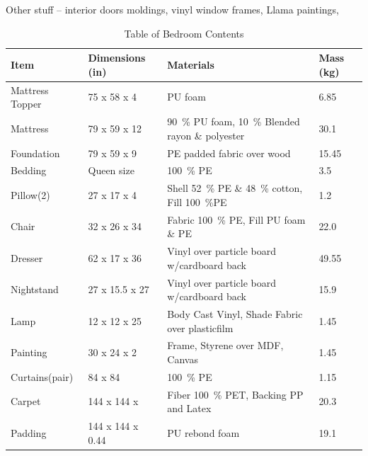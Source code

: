 \documentclass[12pt,oneside]{book}
\begin{document}
Other stuff -- interior doors moldings,  vinyl window frames, Llama paintings, 

\begin{table}[!ht]
	\centering
	\caption{Table of Bedroom Contents}
	\label{tab:BRFuel}
	\begin{tabular}{llll}
		\toprule[1.5pt]
		Item 				& Dimensions (in) 	& Materials 										& Mass (kg)  \\
		\midrule
		Mattress Topper  	& 75 x 58 x 4  		& PU foam  											& 6.85    \\
		Mattress     		& 79 x 59 x 12  	& 90~\% PU foam, 10~\% Blended rayon \& polyester   & 30.1    \\
		Foundation   		& 79 x 59 x 9  		& PE padded fabric over wood  						& 15.45   \\
		Bedding      		& Queen size 		& 100~\% PE     									& 3.5     \\	
		Pillow(2)	 		& 27 x 17 x 4 		& Shell 52~\% PE \& 48~\% cotton, Fill 100~\%PE 	& 1.2     \\	
		Chair				& 32 x 26 x 34		& Fabric 100~\% PE, Fill PU foam \& PE  			& 22.0    \\
		Dresser				& 62 x 17 x 36  	& Vinyl over particle board w/cardboard back		& 49.55   \\
		Nightstand			& 27 x 15.5 x 27	& Vinyl over particle board w/cardboard back		& 15.9    \\
		Lamp 				& 12 x 12 x 25		& Body Cast Vinyl, Shade Fabric over plasticfilm	& 1.45    \\
		Painting			& 30 x 24 x 2		& Frame, Styrene over MDF, Canvas					& 1.45    \\
		Curtains(pair) 		& 84 x 84 			& 100~\% PE 										& 1.15    \\
		Carpet				& 144 x 144 x 		& Fiber 100~\% PET, Backing PP and Latex			& 20.3    \\
		Padding				& 144 x 144 x 0.44	& PU rebond foam									& 19.1	  \\
		\bottomrule[1.25pt]
	\end{tabular}
\end{table}



\FloatBarrier
\end{document}
